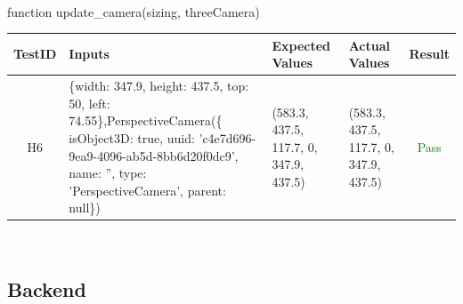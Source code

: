\documentclass[12pt, titlepage]{article}
\begin{document}
\\
function update\_camera(sizing, threeCamera)\\
\begin{tabular}{ |c|p{5cm}|p{3.5cm}|p{3.5cm}|c| } 
 \hline
 TestID & Inputs & Expected Values & Actual Values & Result \\ 
 \hline
 H6 & \{width: 347.9, height: 437.5, top: 50, left: 74.55\},PerspectiveCamera(\{ isObject3D: true, uuid: 'c4e7d696-9ea9-4096-ab5d-8bb6d20f0dc9', name: '', type: 'PerspectiveCamera', parent: null\}) & (583.3, 437.5, 117.7, 0, 347.9, 437.5) & (583.3, 437.5, 117.7, 0, 347.9, 437.5) & \textcolor{green}{Pass} \\ 
 \hline

\end{tabular}
\\



\subsection{Backend}
\end{document}
